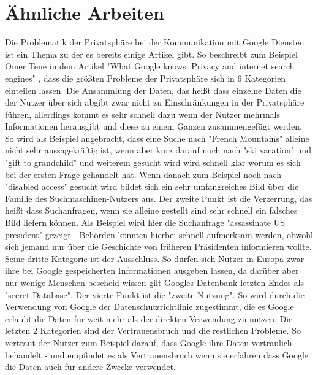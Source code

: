 % 
% 

\chapter{Ähnliche Arbeiten}
Die Problematik der Privatsphäre bei der Kommunikation mit Google Diensten ist ein Thema zu der es bereits einige Artikel gibt. So beschreibt zum Beispiel Omer Tene in dem Artikel "What Google knows: Privacy and internet search engines" \cite{tene2007google}, dass die größten Probleme der Privatsphäre sich in 6 Kategorien einteilen lassen. Die Ansammlung der Daten, das heißt dass einzelne Daten die der Nutzer über sich abgibt zwar nicht zu Einschränkungen in der Privatsphäre führen, allerdings kommt es sehr schnell dazu wenn der Nutzer mehrmals Informationen herausgibt und diese zu einem Ganzen zusammengefügt werden. So wird als Beispiel angebracht, dass eine Suche nach "French Mountains" alleine nicht sehr aussagekräftig ist, wenn aber kurz darauf noch nach "ski vacation" und "gift to grandchild" und weiterem gesucht wird wird schnell klar worum es sich bei der ersten Frage gehandelt hat. Wenn danach zum Beispiel noch nach "disabled access" gesucht wird bildet sich ein sehr umfangreiches Bild über die Familie des Suchmaschinen-Nutzers aus. Der zweite Punkt ist die Verzerrung, das heißt dass Suchanfragen, wenn sie alleine gestellt sind sehr schnell ein falsches Bild liefern können. Als Beispiel wird hier die Suchanfrage "assassinate US president" gezeigt - Behörden könnten hierbei schnell aufmerksam werden, obwohl sich jemand nur über die Geschichte von früheren Präsidenten informieren wollte. Seine dritte Kategorie ist der Ausschluss. So dürfen sich Nutzer in Europa zwar ihre bei Google gespeicherten Informationen ausgeben lassen, da darüber aber nur wenige Menschen bescheid wissen gilt Googles Datenbank letzten Endes als "secret Database". Der vierte Punkt ist die "zweite Nutzung". So wird durch die Verwendung von Google der Datenschutzrichtlinie zugestimmt, die es Google erlaubt die Daten für weit mehr als der direkten Verwendung zu nutzen. Die letzten 2 Kategorien sind der Vertrauensbruch und die restlichen Probleme. So vertraut der Nutzer zum Beispiel darauf, dass Google ihre Daten vertraulich behandelt - und empfindet es als Vertrauensbruch wenn sie erfahren dass Google die Daten auch für andere Zwecke verwendet.

